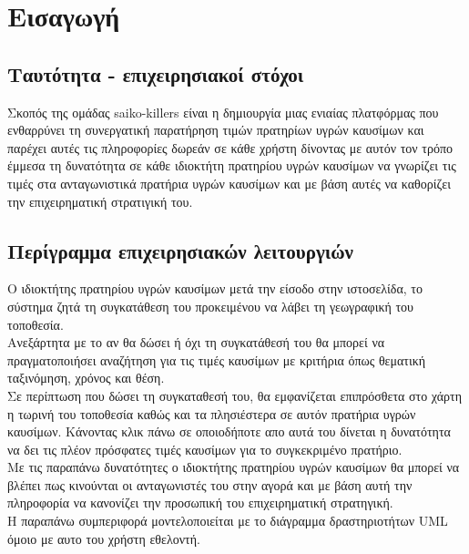 \section{Εισαγωγή}

\subsection{Ταυτότητα - επιχειρησιακοί στόχοι}

Σκοπός της ομάδας saiko-killers είναι η δημιουργία μιας ενιαίας πλατφόρμας που ενθαρρύνει τη συνεργατική παρατήρηση τιμών πρατηρίων υγρών καυσίμων και παρέχει αυτές τις πληροφορίες δωρεάν σε κάθε χρήστη δίνοντας με αυτόν τον τρόπο έμμεσα τη δυνατότητα σε κάθε ιδιοκτήτη πρατηρίου υγρών καυσίμων να γνωρίζει τις τιμές στα ανταγωνιστικά πρατήρια υγρών καυσίμων και με βάση αυτές να καθορίζει την επιχειρηματική στρατιγική του.

\subsection{Περίγραμμα επιχειρησιακών λειτουργιών}

O ιδιοκτήτης πρατηρίου υγρών καυσίμων μετά την είσοδο στην ιστοσελίδα, το σύστημα ζητά τη συγκατάθεση του προκειμένου να λάβει τη γεωγραφική του τοποθεσία. \\
Ανεξάρτητα με το αν θα δώσει ή όχι τη συγκατάθεσή του θα μπορεί να πραγματοποιήσει αναζήτηση για τις τιμές καυσίμων με κριτήρια όπως θεματική ταξινόμηση, χρόνος και θέση.\\
Σε περίπτωση που δώσει τη συγκαταθεσή του, θα εμφανίζεται επιπρόσθετα στο χάρτη η τωρινή του τοποθεσία καθώς και τα πλησιέστερα σε αυτόν πρατήρια υγρών καυσίμων. Κάνοντας κλικ πάνω σε οποιοδήποτε απο αυτά του δίνεται η δυνατότητα να δει τις πλέον πρόσφατες τιμές καυσίμων για το συγκεκριμένο πρατήριο.\\
Με τις παραπάνω δυνατότητες ο ιδιοκτήτης πρατηρίου υγρών καυσίμων θα μπορεί να βλέπει πως κινούνται οι ανταγωνιστές του στην αγορά και με βάση αυτή την πληροφορία να κανονίζει την προσωπική του επιχειρηματική στρατηγική.\\
Η παραπάνω συμπεριφορά μοντελοποιείται με το διάγραμμα δραστηριοτήτων UML όμοιο με αυτο του χρήστη εθελοντή.

